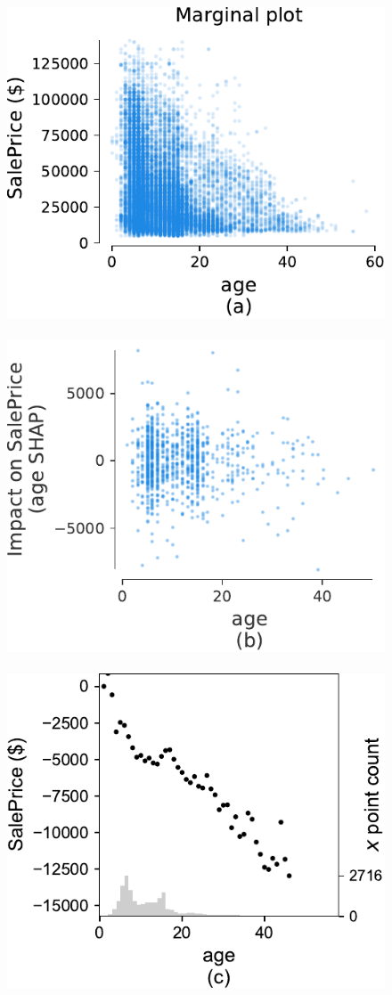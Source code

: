 \documentclass[twoside,11pt]{article}
\begin{document}
\begin{figure}[htbp]
\begin{center}
\includegraphics[scale=0.6]{images/bulldozer-age-marginal.pdf}~~
\includegraphics[scale=0.6]{images/bulldozer-age-shap.pdf}~~
\includegraphics[scale=0.6]{images/bulldozer-age-stratpd.pdf}

\end{center}
\end{figure}
\end{document}
